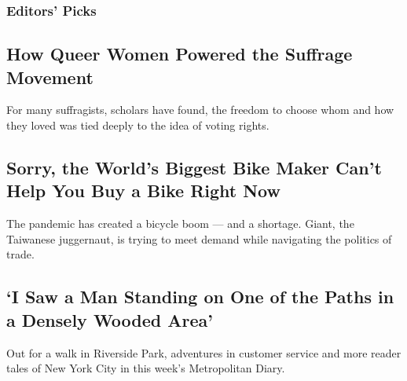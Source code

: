 \hypertarget{editors-picks}{%
\subsubsection{Editors' Picks}\label{editors-picks}}

\href{/2020/08/14/us/queer-lesbian-women-suffrage.html}{}

\hypertarget{how-queer-women-powered-the-suffrage-movement}{%
\subsection{How Queer Women Powered the Suffrage
Movement}\label{how-queer-women-powered-the-suffrage-movement}}

For many suffragists, scholars have found, the freedom to choose whom
and how they loved was tied deeply to the idea of voting rights.

\href{/2020/08/17/business/giant-bikes-coronavirus-shortage.html}{}

\hypertarget{sorry-the-worlds-biggest-bike-maker-cant-help-you-buy-a-bike-right-now}{%
\subsection{Sorry, the World's Biggest Bike Maker Can't Help You Buy a
Bike Right
Now}\label{sorry-the-worlds-biggest-bike-maker-cant-help-you-buy-a-bike-right-now}}

The pandemic has created a bicycle boom --- and a shortage. Giant, the
Taiwanese juggernaut, is trying to meet demand while navigating the
politics of trade.

\href{/2020/08/17/business/giant-bikes-coronavirus-shortage.html}{}

\href{/2020/08/16/nyregion/metropolitan-diary.html}{}

\hypertarget{i-saw-a-man-standing-on-one-of-the-paths-in-a-densely-wooded-area}{%
\subsection{`I Saw a Man Standing on One of the Paths in a Densely
Wooded
Area'}\label{i-saw-a-man-standing-on-one-of-the-paths-in-a-densely-wooded-area}}

Out for a walk in Riverside Park, adventures in customer service and
more reader tales of New York City in this week's Metropolitan Diary.

\href{/2020/08/16/nyregion/metropolitan-diary.html}{}


